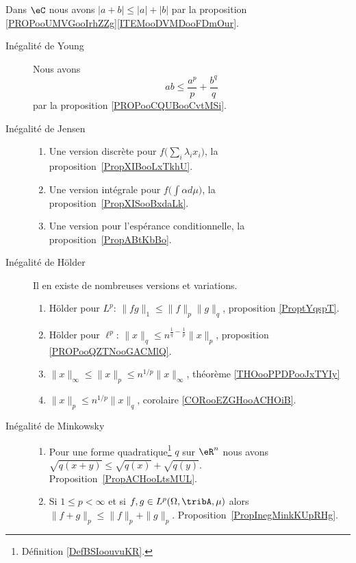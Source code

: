 
Dans \( \eC\) nous avons \( | a+ b|\leq | a |+| b |\) par la proposition \ref{PROPooUMVGooIrhZZg}\ref{ITEMooDVMDooFDmOur}.
\begin{description}
	\item[Inégalité de Young]
	      Nous avons
	      \begin{equation}
		      ab\leq \frac{ a^p }{ p }+\frac{ b^q }{ q }
	      \end{equation}
	      par la proposition \ref{PROPooCQUBooCvtMSi}.
	\item[Inégalité de Jensen]
	      \begin{enumerate}
		      \item
		            Une version discrète pour \( f\big( \sum_i\lambda_ix_i \big)\), la proposition~\ref{PropXIBooLxTkhU}.
		      \item
		            Une version intégrale pour \( f\big( \int \alpha d\mu \big)\), la proposition~\ref{PropXISooBxdaLk}.
		      \item
		            Une version pour l'espérance conditionnelle, la proposition~\ref{PropABtKbBo}.
	      \end{enumerate}
	\item[Inégalité de Hölder]
        Il en existe de nombreuses versions et variations.
	      \begin{enumerate}
		      \item
		            Hölder pour \( L^p\): \( \| fg \|_1\leq \| f \|_p\| g \|_q\), proposition \ref{ProptYqspT}.
		      \item
		            Hölder pour \( \ell^p\): \( \| x \|_q\leq n^{\frac{1}{ q }-\frac{1}{ p }}\| x \|_p\), proposition \ref{PROPooQZTNooGACMlQ}.
                \item
                    $\| x \|_{\infty}\leq \| x \|_p\leq n^{1/p}\| x \|_{\infty}$, théorème \ref{THOooPPDPooJxTYIy}
                \item
                    $\| x \|_p\leq n^{1/p} \| x \|_q$, corolaire \ref{CORooEZGHooACHOiB}.
	      \end{enumerate}
	\item[Inégalité de Minkowsky]
	      \begin{enumerate}
		      \item
		            Pour une forme quadratique\footnote{Définition \ref{DefBSIoouvuKR}.} \( q\) sur \( \eR^n\) nous avons \( \sqrt{q(x+y)}\leq\sqrt{q(x)}+\sqrt{q(y)}\). Proposition~\ref{PropACHooLtsMUL}.
		      \item
		            Si \( 1\leq p<\infty\) et si \( f,g\in L^p(\Omega,\tribA,\mu)\) alors \(  \| f+g \|_p\leq \| f \|_p+\| g \|_p\). Proposition~\ref{PropInegMinkKUpRHg}.

\end{enumerate}
\end{description}
